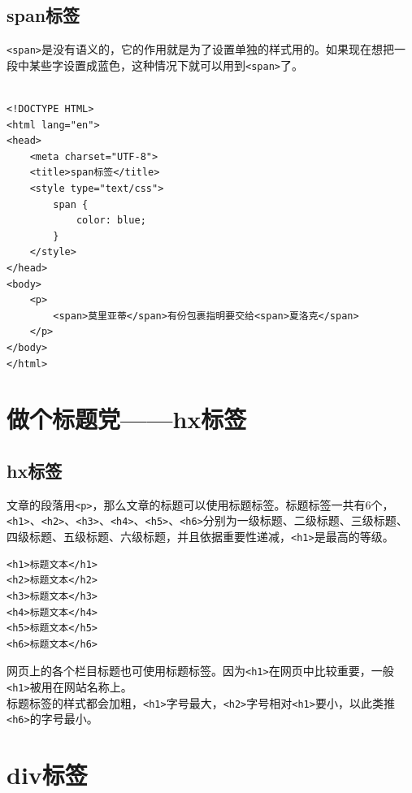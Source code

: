\subsection{span标签}

\lstinline|<span>|是没有语义的，它的作用就是为了设置单独的样式用的。如果现在想把一段中某些字设置成蓝色，这种情况下就可以用到\lstinline|<span>|了。 \\

 \\
\begin{lstlisting}[style=htmlcssjs]
<!DOCTYPE HTML>
<html lang="en">
<head>
    <meta charset="UTF-8">
    <title>span标签</title>
    <style type="text/css">
        span {
            color: blue;
        }
    </style>
</head>
<body>
    <p>
        <span>莫里亚蒂</span>有份包裹指明要交给<span>夏洛克</span>
    </p>
</body>
</html>
\end{lstlisting}

\newpage

\section{做个标题党——hx标签}

\subsection{hx标签}

文章的段落用\lstinline|<p>|，那么文章的标题可以使用标题标签。标题标签一共有6个，\lstinline|<h1>|、\lstinline|<h2>|、\lstinline|<h3>|、\lstinline|<h4>|、\lstinline|<h5>|、\lstinline|<h6>|分别为一级标题、二级标题、三级标题、四级标题、五级标题、六级标题，并且依据重要性递减，\lstinline|<h1>|是最高的等级。 \\

\begin{lstlisting}[style=htmlcssjs]
<h1>标题文本</h1>
<h2>标题文本</h2>
<h3>标题文本</h3>
<h4>标题文本</h4>
<h5>标题文本</h5>
<h6>标题文本</h6>
\end{lstlisting}

网页上的各个栏目标题也可使用标题标签。因为\lstinline|<h1>|在网页中比较重要，一般\lstinline|<h1>|被用在网站名称上。 \\

标题标签的样式都会加粗，\lstinline|<h1>|字号最大，\lstinline|<h2>|字号相对\lstinline|<h1>|要小，以此类推\lstinline|<h6>|的字号最小。

\newpage

\section{div标签}

